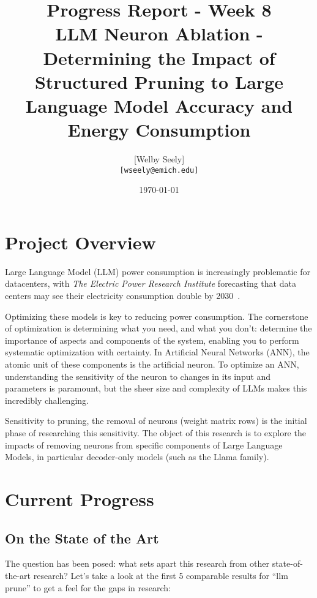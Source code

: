 \documentclass{article}
\title{Progress Report - Week 8 \\
\large LLM Neuron Ablation - Determining the Impact of Structured Pruning to Large Language Model Accuracy and Energy Consumption}
\author{
    [Welby Seely] \\
    \texttt{[wseely@emich.edu]}
}
\date{\today}
\begin{document}
    \maketitle


    \section{Project Overview}\label{sec:project-overview}
    Large Language Model (LLM) power consumption is increasingly problematic for datacenters, with \textit{The Electric Power
    Research Institute} forecasting that data centers may see their electricity consumption double by
    2030~\cite{kindig2024}.

    Optimizing these models is key to reducing power consumption.
    The cornerstone of optimization is determining what you need, and what you don't: determine the importance of
    aspects and components of the system, enabling you to perform systematic optimization with certainty.
    In Artificial Neural Networks (ANN), the atomic unit of these components is the artificial neuron.
    To optimize an ANN, understanding the sensitivity of the neuron to changes in its input and parameters is paramount,
    but the sheer size and complexity of LLMs makes this incredibly challenging.

    Sensitivity to pruning, the removal of neurons (weight matrix rows) is the initial phase of researching this sensitivity.
    The object of this research is to explore the impacts of removing neurons from specific components of Large Language Models, in particular decoder-only models (such as the Llama family).

    \section{Current Progress}\label{sec:current-progress}

    \subsection{On the State of the Art}\label{subsec:on-soa-research}

    The question has been posed: what sets apart this research from other state-of-the-art research?
    Let's take a look at the first 5 comparable results for ``llm prune'' to get a feel for the gaps in research:
\end{document}
